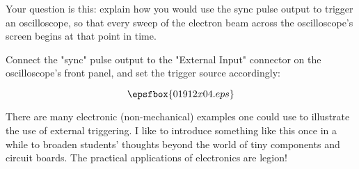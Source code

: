 Your question is this: explain how you would use the sync pulse output to trigger an oscilloscope, so that every sweep of the electron beam across the oscilloscope's screen begins at that point in time.

\vskip 10pt









Connect the "sync" pulse output to the "External Input" connector on the oscilloscope's front panel, and set the trigger source accordingly:

$$\epsfbox{01912x04.eps}$$







There are many electronic (non-mechanical) examples one could use to illustrate the use of external triggering.  I like to introduce something like this once in a while to broaden students' thoughts beyond the world of tiny components and circuit boards.  The practical applications of electronics are legion!




